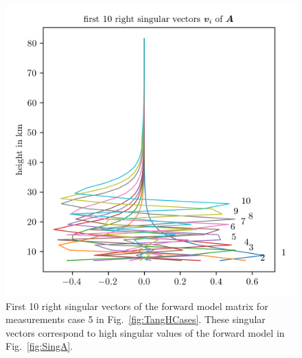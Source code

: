 
\begin{figure}[ht!]
	\centering
	\includegraphics{SingVecA.png}
	\caption[First 10 right singular vectors of forward model.]{First 10 right singular vectors of the forward model matrix for measurements case 5 in Fig.~\ref{fig:TangHCases}. These singular vectors correspond to high singular values of the forward model in Fig.~\ref{fig:SingA}.}
	\label{fig:SingVecA}
\end{figure}

